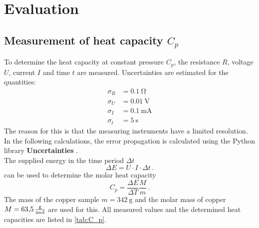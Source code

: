 \section{Evaluation}
\label{sec:evaluation}

\subsection{Measurement of heat capacity $C_p$}
To determine the heat capacity at constant pressure $C_p$, the resistance $R$, voltage $U$, current $I$ and time $t$ are measured.
Uncertainties are estimated for the quantities:
\begin{align*}
    \sigma_R &= \qty{0.1}{\ohm} \\
    \sigma_U &= \qty{0.01}{\volt}\\
    \sigma_I &= \qty{0.1}{\milli\ampere} \\
    \sigma_t &= \qty{5}{\second}
\end{align*}
The reason for this is that the measuring instruments have a limited resolution.
In the following calculations, the error propagation is calculated using the Python library \textbf{Uncertainties} \cite{uncertainties}.
\\
The supplied energy in the time period $\Delta t$
\begin{equation}
    \Delta E = U \cdot I \cdot \Delta t \, .
\end{equation}
can be used to determine the molar heat capacity
\begin{equation}
    C_p = \frac{\Delta E}{\Delta T} \frac{M}{m} \,.
\end{equation}
The mass of the copper sample $m = \qty{342}{\gram}$ \cite{V47} and the molar mass of copper $M = \qty{63.5}{\frac{\gram}{\mol}}$ \cite{goodfellow} are used for this.
All measured values and the determined heat capacities are listed in \autoref{tab:C_p}.
